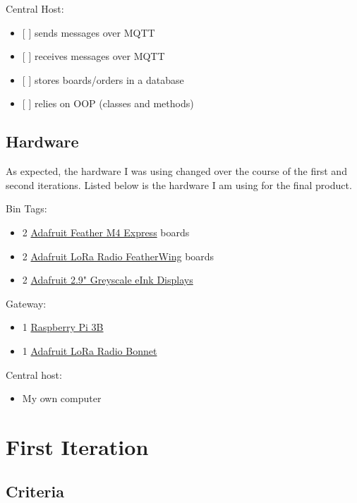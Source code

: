 \documentclass{article}
\begin{document}
Central Host:

\begin{itemize}
\item
  {[} {]} sends messages over MQTT
\item
  {[} {]} receives messages over MQTT
\item
  {[} {]} stores boards/orders in a database
\item
  {[} {]} relies on OOP (classes and methods)
\end{itemize}

\subsection{Hardware}\label{hardware}

As expected, the hardware I was using changed over the course of the
first and second iterations. Listed below is the hardware I am using for
the final product.

Bin Tags:

\begin{itemize}
\item
  2 \href{https://www.adafruit.com/product/3857}{Adafruit Feather M4
  Express} boards~
\item
  2 \href{https://www.adafruit.com/product/3231}{Adafruit LoRa Radio
  FeatherWing} boards~
\item
  2 \href{https://www.adafruit.com/product/4777}{Adafruit 2.9" Greyscale
  eInk Displays}~
\end{itemize}

Gateway:

\begin{itemize}
\item
  1
  \href{https://www.raspberrypi.com/products/raspberry-pi-3-model-b/}{Raspberry
  Pi 3B}
\item
  1 \href{https://www.adafruit.com/product/4074}{Adafruit LoRa Radio
  Bonnet}
\end{itemize}

Central host:

\begin{itemize}
\item
  My own computer
\end{itemize}

\section{First Iteration}\label{first-iteration}

\subsection{Criteria}\label{criteria-1}
\end{document}
